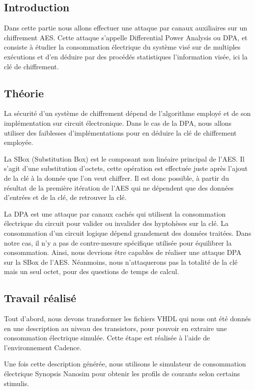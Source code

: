 \subsection{Introduction}

Dans cette partie nous allons effectuer une attaque par canaux auxiliaires
sur un chiffrement AES. Cette attaque s'appelle Differential Power Analysis ou
DPA, et consiste à étudier la consommation électrique du système visé sur de
multiples exécutions et d'en déduire par des procédés statistiques l'information
visée, ici la clé de chiffrement.

\subsection{Théorie}
La sécurité d'un système de chiffrement dépend de l'algorithme employé et de
son implémentation sur circuit électronique. Dans le cas de la DPA, nous allons
utiliser des faiblesses d'implémentations pour en déduire la clé de chiffrement
employée.

La SBox (Substitution Box) est le composant non linéaire principal de l'AES. Il
s'agit d'une substitution d'octets, cette opération est effectuée juste après
l'ajout de la clé à la donnée que l'on veut chiffrer. Il est donc possible,
à partir du résultat de la première itération de l'AES qui ne dépendent que
des données d'entrées et de la clé, de retrouver la clé.

La DPA est une attaque par canaux cachés qui utilisent la consommation
électrique du circuit pour valider ou invalider des hyptohèses sur la clé.
La consommation d'un circuit logique dépend grandement des données traitées.
Dans notre cas, il n'y a pas de contre-mesure spécifique utilisée pour
équilibrer la consommation. Ainsi, nous devrions être capables de réaliser
une attaque DPA sur la SBox de l'AES. Néanmoins, nous n'attaquerons pas
la totalité de la clé mais un seul octet, pour des questions de temps de calcul.

\subsection{Travail réalisé}

Tout d'abord, nous devons transformer les fichiers VHDL qui nous ont été donnés
en une description au niveau des transistors, pour pouvoir en extraire une
consommation électrique simulée. Cette étape est réalisée à l'aide de
l'environnement Cadence.

Une fois cette description générée, nous utilisons le simulateur de consommation
électrique Synopsis Nanosim pour obtenir les profils de courants selon certains
stimulis.

